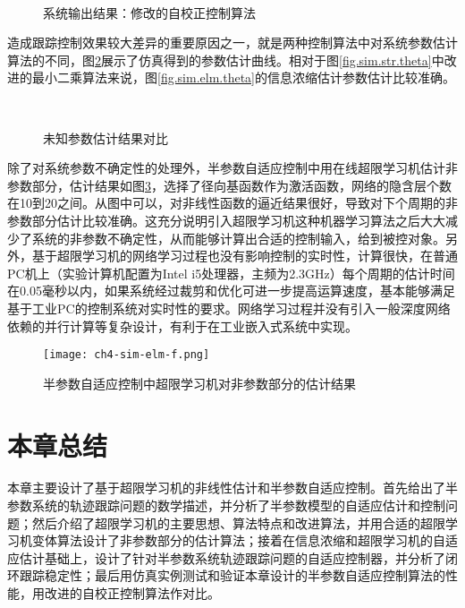 \begin{figure}[!htb]
	\centering
	\\
	\caption{系统输出结果：修改的自校正控制算法}
	\label{fig.sim.str.sys}
\end{figure}

造成跟踪控制效果较大差异的重要原因之一，就是两种控制算法中对系统参数估计算法的不同，图\ref{fig.sim.str.sys}展示了仿真得到的参数估计曲线。相对于图\ref{fig.sim.str.theta}中改进的最小二乘算法来说，图\ref{fig.sim.elm.theta}的信息浓缩估计参数估计比较准确。
\begin{figure}[!htb]
	\centering
	\\
	\caption{未知参数估计结果对比}
	\label{fig.sim.str.sys}
\end{figure}

除了对系统参数不确定性的处理外，半参数自适应控制中用在线超限学习机估计非参数部分，估计结果如图\ref{fig:4.sim.elm.f}，选择了径向基函数作为激活函数，网络的隐含层个数在10到20之间。从图中可以，对非线性函数的逼近结果很好，导致对下个周期的非参数部分估计比较准确。这充分说明引入超限学习机这种机器学习算法之后大大减少了系统的非参数不确定性，从而能够计算出合适的控制输入，给到被控对象。另外，基于超限学习机的网络学习过程也没有影响控制的实时性，计算很快，在普通PC机上（实验计算机配置为Intel i5处理器，主频为2.3GHz）每个周期的估计时间在0.05毫秒以内，如果系统经过裁剪和优化可进一步提高运算速度，基本能够满足基于工业PC的控制系统对实时性的要求。网络学习过程并没有引入一般深度网络依赖的并行计算等复杂设计，有利于在工业嵌入式系统中实现。
\begin{figure}[!htb]
  \centering
  \texttt{[image: ch4-sim-elm-f.png]}\\
  \caption{半参数自适应控制中超限学习机对非参数部分的估计结果}
  \label{fig:4.sim.elm.f}
\end{figure}

\section{本章总结}\label{sect:4.5}
本章主要设计了基于超限学习机的非线性估计和半参数自适应控制。首先给出了半参数系统的轨迹跟踪问题的数学描述，并分析了半参数模型的自适应估计和控制问题；然后介绍了超限学习机的主要思想、算法特点和改进算法，并用合适的超限学习机变体算法设计了非参数部分的估计算法；接着在信息浓缩和超限学习机的自适应估计基础上，设计了针对半参数系统轨迹跟踪问题的自适应控制器，并分析了闭环跟踪稳定性；最后用仿真实例测试和验证本章设计的半参数自适应控制算法的性能，用改进的自校正控制算法作对比。
